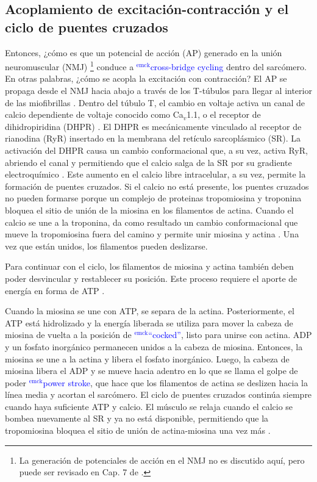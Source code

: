 \documentclass[12pt]{article}
\newcommand{\emck}[1]{\textcolor{blue}{$^{\textrm{emck}}${#1}}}
\begin{document}
\subsection*{Acoplamiento de excitación-contracción y el ciclo de puentes cruzados}
Entonces, ¿cómo es que un potencial de acción (AP) generado en la
unión neuromuscular (NMJ) \footnote {La generación de potenciales de
  acción en el NMJ no es discutido aquí, pero puede ser revisado en
  Cap. 7 de \cite{guyton20006textbook}.} conduce a \emck{cross-bridge
  cycling} dentro del sarcómero. En otras palabras, ¿cómo se acopla la
excitación con contracción? El AP se propaga desde el NMJ hacia abajo
a través de los T-túbulos para llegar al interior de las miofibrillas
\cite{openStax2016contraction}. Dentro del túbulo T, el cambio en
voltaje activa un canal de calcio dependiente de voltaje conocido como
Ca$_{v}$1.1, o el receptor de dihidropiridina (DHPR)
\cite{schneider2012skeletal}.  El DHPR es mecánicamente vinculado al
receptor de rianodina (RyR) insertado en la membrana del retículo
sarcoplásmico (SR). La activación del DHPR causa un cambio
conformacional que, a su vez, activa RyR, abriendo el canal y
permitiendo que el calcio salga de la SR por su gradiente
electroquímico \cite{schneider2012skeletal}. Este aumento en el calcio
libre intracelular, a su vez, permite la formación de puentes
cruzados. Si el calcio no está presente, los puentes cruzados no
pueden formarse porque un complejo de proteinas tropomiosina y
troponina bloquea el sitio de unión de la miosina en los filamentos de
actina. Cuando el calcio se une a la troponina, da como resultado un
cambio conformacional que mueve la tropomiosina fuera del camino y
permite unir miosina y actina \cite{openStax2016contraction}. Una vez
que están unidos, los filamentos pueden deslizarse.

Para continuar con el ciclo, los filamentos de miosina y actina
también deben poder desvincular y restablecer su posición. Este
proceso requiere el aporte de energía en forma de ATP
\cite{openStax2016contraction}.

Cuando la miosina se une con ATP, se separa de la
actina. Posteriormente, el ATP está hidrolizado y la energía liberada
se utiliza para mover la cabeza de miosina de vuelta a la posición de
\emck{``cocked''}, listo para unirse con actina. ADP y un fosfato
inorgánico permanecen unidos a la cabeza de miosina. Entonces, la
miosina se une a la actina y libera el fosfato inorgánico. Luego, la
cabeza de miosina libera el ADP y se mueve hacia adentro en lo que se
llama el golpe de poder \emck{power stroke}, que hace que los
filamentos de actina se deslizen hacia la línea media y acortan el
sarcómero. El ciclo de puentes cruzados continúa siempre cuando haya
suficiente ATP y calcio. El músculo se relaja cuando el calcio se
bombea nuevamente al SR y ya no está disponible, permitiendo que la
tropomiosina bloquea el sitio de unión de actina-miosina una vez más
\cite{openStax2016contraction}.
\end{document}
